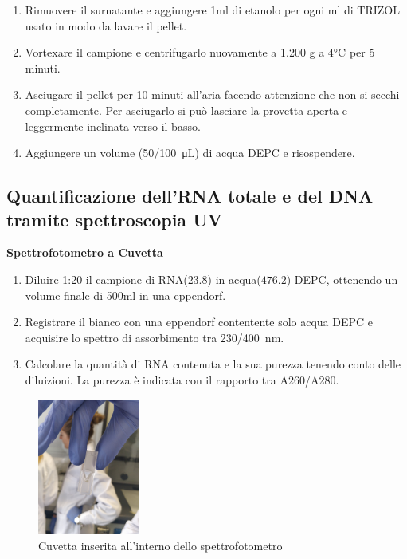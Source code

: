 \begin{enumerate}
\item Rimuovere il surnatante e aggiungere 1ml di etanolo per ogni ml di TRIZOL usato in modo da lavare il pellet.

\item Vortexare il campione e centrifugarlo nuovamente a 1.200 g a 4°C per 5 minuti.

\item Asciugare il pellet per 10 minuti all’aria facendo attenzione che non si secchi completamente.
Per asciugarlo si pu\`o lasciare la provetta aperta e leggermente inclinata verso il basso.

\item Aggiungere un volume (\SI{50/100}{\micro\liter}) di acqua DEPC e risospendere.
\end{enumerate}

\subsection{Quantificazione dell’RNA totale e del DNA tramite spettroscopia UV}

\textbf{Spettrofotometro a Cuvetta}
\vspace{0.5cm}

\begin{enumerate}
\item  Diluire 1:20 il campione di RNA($23.8$) in acqua($476.2$) DEPC,
ottenendo un volume finale di 500ml in una eppendorf.
\item  Registrare il bianco con una eppendorf contentente solo acqua DEPC e acquisire
lo spettro di assorbimento tra \SI{230/400}{\nano\meter}.
\item  Calcolare la quantità di RNA contenuta e la sua purezza tenendo conto delle diluizioni.
La purezza è indicata con il rapporto tra A260/A280.
\end{enumerate}
\begin{figure}[H]

\centering
\includegraphics[width=0.3\textwidth]{./immagini/cuvetta.jpg}
\caption{Cuvetta inserita all'interno dello spettrofotometro}
\label{cuvetta}

\end{figure}

